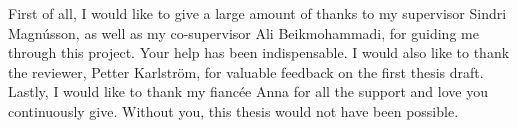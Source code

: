 \thispagestyle{empty}

First of all, I would like to give a large amount of thanks to my supervisor Sindri Magnússon, as well as my co-supervisor Ali Beikmohammadi, for guiding me through this project. Your help has been indispensable. I would also like to thank the reviewer, Petter Karlström, for valuable feedback on the first thesis draft. Lastly, I would like to thank my fiancée Anna for all the support and love you continuously give. Without you, this thesis would not have been possible. 